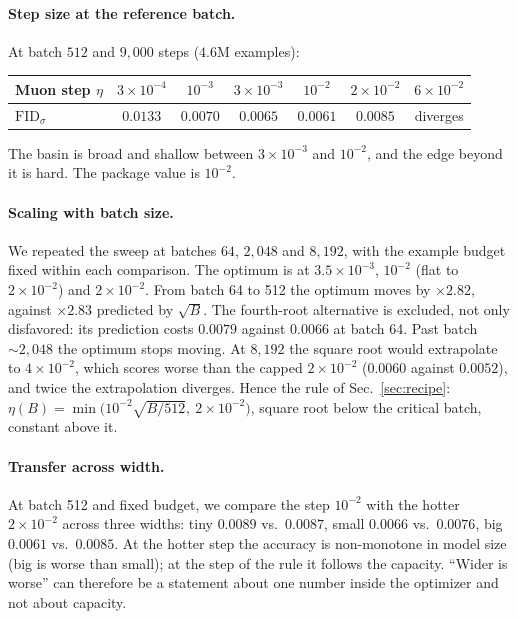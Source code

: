 \documentclass[10pt]{article}
\newcommand{\FIDsd}{\mathrm{FID}_{\sigma}}
\begin{document}
\paragraph{Step size at the reference batch.} At batch $512$ and $9{,}000$ steps ($4.6$M examples):

\begin{center}
\small
\begin{tabular}{@{}lcccccc@{}}
\toprule
Muon step $\eta$ & $3\times10^{-4}$ & $10^{-3}$ & $3\times10^{-3}$ & $10^{-2}$ & $2\times10^{-2}$ & $6\times10^{-2}$ \\
\midrule
$\FIDsd$ & $0.0133$ & $0.0070$ & $0.0065$ & $0.0061$ & $0.0085$ & diverges \\
\bottomrule
\end{tabular}
\end{center}

The basin is broad and shallow between $3\times10^{-3}$ and $10^{-2}$, and the edge beyond it is
hard. The package value is $10^{-2}$.

\paragraph{Scaling with batch size.} We repeated the sweep at batches $64$, $2{,}048$ and $8{,}192$,
with the example budget fixed within each comparison. The optimum is at $3.5\times10^{-3}$, $10^{-2}$
(flat to $2\times10^{-2}$) and $2\times10^{-2}$. From batch 64 to 512 the optimum moves by
$\times2.82$, against $\times2.83$ predicted by $\sqrt{B}$. The fourth-root alternative is excluded,
not only disfavored: its prediction costs $0.0079$ against $0.0066$ at batch 64. Past batch
${\sim}2{,}048$ the optimum stops moving. At $8{,}192$ the square root would extrapolate to
$4\times10^{-2}$, which scores worse than the capped $2\times10^{-2}$ ($0.0060$ against $0.0052$),
and twice the extrapolation diverges. Hence the rule of Sec.~\ref{sec:recipe}:
$\eta(B) = \min\bigl(10^{-2}\sqrt{B/512},\ 2\times10^{-2}\bigr)$, square root below the critical
batch, constant above it.

\paragraph{Transfer across width.} At batch 512 and fixed budget, we compare the step $10^{-2}$ with
the hotter $2\times10^{-2}$ across three widths: tiny $0.0089$ vs.\ $0.0087$, small $0.0066$ vs.\
$0.0076$, big $0.0061$ vs.\ $0.0085$. At the hotter step the accuracy is non-monotone in model size
(big is worse than small); at the step of the rule it follows the capacity. ``Wider is worse'' can
therefore be a statement about one number inside the optimizer and not about capacity.
\end{document}
